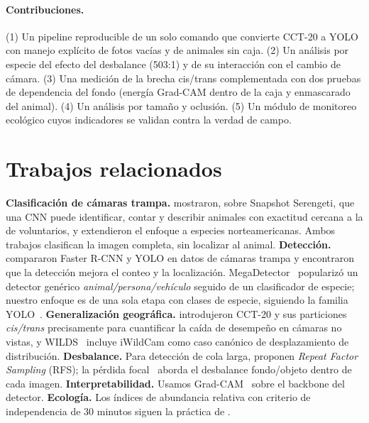 \documentclass{article}
\begin{document}
\paragraph{Contribuciones.} (1) Un pipeline reproducible de un solo comando que convierte CCT-20 a
YOLO con manejo explícito de fotos vacías y de animales sin caja. (2) Un análisis por especie del
efecto del desbalance (503:1) y de su interacción con el cambio de cámara. (3) Una medición de la brecha cis/trans complementada
con dos pruebas de dependencia del fondo (energía Grad-CAM dentro de la caja y enmascarado del
animal). (4) Un análisis por tamaño y oclusión. (5) Un módulo de monitoreo ecológico cuyos
indicadores se validan contra la verdad de campo.

\section{Trabajos relacionados}
\textbf{Clasificación de cámaras trampa.} \citet{norouzzadeh2018} mostraron, sobre Snapshot
Serengeti, que una CNN puede identificar, contar y describir animales con exactitud cercana a la de
voluntarios, y \citet{tabak2019} extendieron el enfoque a especies norteamericanas. Ambos trabajos
clasifican la imagen completa, sin localizar al animal.
\textbf{Detección.} \citet{schneider2018} compararon Faster R-CNN y YOLO en datos de cámaras trampa y
encontraron que la detección mejora el conteo y la localización. MegaDetector~\citep{beery2019megadetector}
popularizó un detector genérico \emph{animal/persona/vehículo} seguido de un clasificador de especie;
nuestro enfoque es de una sola etapa con clases de especie, siguiendo la familia YOLO~\citep{redmon2016yolo,jocher2023yolov8,wang2024yolov9}.
\textbf{Generalización geográfica.} \citet{beery2018recognition} introdujeron CCT-20 y sus particiones
\emph{cis/trans} precisamente para cuantificar la caída de desempeño en cámaras no vistas, y
WILDS~\citep{koh2021wilds} incluye iWildCam como caso canónico de desplazamiento de distribución.
\textbf{Desbalance.} Para detección de cola larga, \citet{gupta2019lvis} proponen \emph{Repeat Factor
Sampling} (RFS); la pérdida focal~\citep{lin2017focal} aborda el desbalance fondo/objeto dentro de
cada imagen. \textbf{Interpretabilidad.} Usamos Grad-CAM~\citep{selvaraju2017gradcam}
sobre el backbone del detector. \textbf{Ecología.} Los índices de abundancia relativa con criterio de
independencia de 30 minutos siguen la práctica de \citet{obrien2003}.
\end{document}
